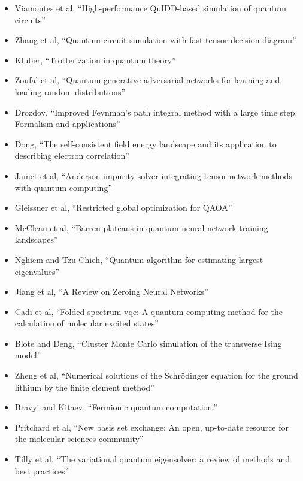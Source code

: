 \documentclass[]{article}
\begin{document}
\begin{itemize}
\item Viamontes et al\cite{viamontes2004high}, ``High-performance QuIDD-based simulation of quantum circuits''
\item Zhang et al\cite{zhang2024quantum}, ``Quantum circuit simulation with fast tensor decision diagram''
\item Kluber\cite{kluber2023trotterization}, ``Trotterization in quantum theory''
\item Zoufal et al\cite{zoufal2019quantum}, ``Quantum generative adversarial networks for learning and loading random distributions''
\item Drozdov\cite{drozdov1998improved}, ``Improved Feynman’s path integral method with a large time step: Formalism and applications''
\item Dong\cite{SpancerDongthesis}, ``The self-consistent field energy landscape and its application to describing electron correlation''
\item Jamet et al\cite{jamet2025anderson}, ``Anderson impurity solver integrating tensor network methods with quantum computing''
\item Gleissner et al\cite{gleissner2024restricted}, ``Restricted global optimization for QAOA''
\item McClean et al\cite{mcclean2018barren}, ``Barren plateaus in quantum neural network training landscapes''
\item Nghiem and Tzu-Chieh\cite{nghiem2023quantum}, ``Quantum algorithm for estimating largest eigenvalues''
\item Jiang et al\cite{jiang2025review}, ``A Review on Zeroing Neural Networks''
\item Cadi et al\cite{cadi2024folded}, ``Folded spectrum vqe: A quantum computing method for the calculation of molecular excited states''
\item Blote and Deng\cite{blote2002cluster}, ``Cluster Monte Carlo simulation of the transverse Ising model''
\item Zheng et al\cite{zheng2004numerical}, ``Numerical solutions of the Schr{\"o}dinger equation for the ground lithium by the finite element method''
\item Bravyi and Kitaev\cite{bravyi2002fermionic}, ``Fermionic quantum computation.''
\item Pritchard et al, ``New basis set exchange: An open, up-to-date resource for the molecular sciences community''
\item Tilly et al\cite{tilly2022variational}, ``The variational quantum eigensolver: a review of methods and best practices''

\end{itemize}
\end{document}
